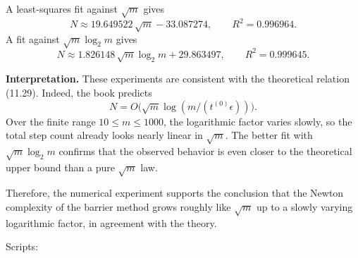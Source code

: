 \documentclass[11pt,letter,notitlepage]{article}
\theoremstyle{definition}
\begin{document}
\begin{solution}
A least-squares fit against $\sqrt{m}$ gives
\[
N \approx 19.649522\,\sqrt{m}-33.087274,
\qquad
R^2 = 0.996964.
\]
A fit against $\sqrt{m}\log_2 m$ gives
\[
N \approx 1.826148\,\sqrt{m}\log_2 m + 29.863497,
\qquad
R^2 = 0.999645.
\]

\textbf{Interpretation.}
These experiments are consistent with the theoretical relation (11.29). Indeed, the book predicts
\[
N = O\!\bigl(\sqrt{m}\log(m/(t^{(0)}\epsilon))\bigr).
\]
Over the finite range $10\le m\le 1000$, the logarithmic factor varies slowly, so the total step count already looks nearly linear in $\sqrt{m}$. The better fit with $\sqrt{m}\log_2 m$ confirms that the observed behavior is even closer to the theoretical upper bound than a pure $\sqrt{m}$ law.

Therefore, the numerical experiment supports the conclusion that the Newton complexity of the barrier method grows roughly like $\sqrt{m}$ up to a slowly varying logarithmic factor, in agreement with the theory.

Scripts:

\end{solution}
	
\end{document}
